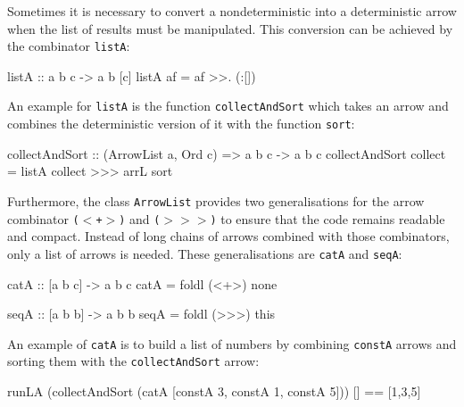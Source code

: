 \documentclass[11pt,a4paper,headsepline, bibtotoc]{scrreprt}
\begin{document}
Sometimes it is necessary to convert a nondeterministic into a deterministic arrow when the list of results must be manipulated. This conversion can be achieved by the combinator \texttt{listA}:
\begin{code}
listA :: a b c -> a b [c]
listA af = af >>. (:[])
\end{code}
An example for \texttt{listA} is the function \texttt{collectAndSort} which takes an arrow and combines the deterministic version of it with the function \texttt{sort}:
\begin{code}[caption=Determenistic Arrow]
collectAndSort :: (ArrowList a, Ord c) => a b c -> a b c
collectAndSort collect = listA collect >>> arrL sort
\end{code}
Furthermore, the class \texttt{ArrowList} provides two generalisations for the arrow combinator {\tt ($<$+$>$)} and {\tt ($>$$>$$>$)} to ensure that the code remains readable and compact. Instead of long chains of arrows combined with those combinators, only a list of arrows is needed.  These generalisations are \texttt{catA} and \texttt{seqA}:
\begin{code}
catA :: [a b c] -> a b c
catA = foldl (<+>) none

seqA :: [a b b] -> a b b
seqA = foldl (>>>) this
\end{code}
An example of \texttt{catA} is to build a list of numbers by combining \texttt{constA} arrows and sorting them with the \texttt{collectAndSort} arrow:
\begin{code}[caption=Generalisation of ($>$$>$$>$)]
runLA (collectAndSort (catA [constA 3, constA 1, constA 5])) [] 
  == [1,3,5]
\end{code}
\end{document}

